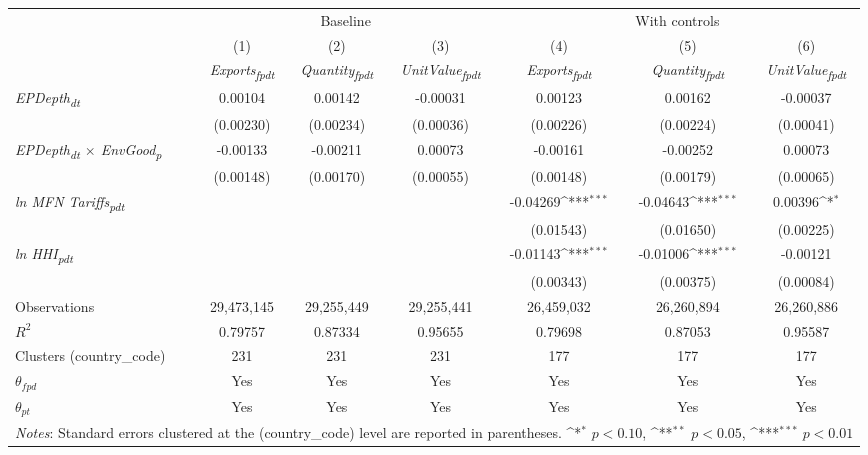 {
\def\sym#1{\ifmmode^{#1}\else\(^{#1}\)\fi}
\begin{tabular}{l*{6}{c}}
\toprule
&\multicolumn{3}{c}{Baseline}&\multicolumn{3}{c}{With controls}\\\cmidrule(lr){2-4}\cmidrule(lr){5-7}
&(1)&(2)&(3)&(4)&(5)&(6)\\
&\textit{Exports\textsubscript{fpdt}}&\textit{Quantity\textsubscript{fpdt}}&\textit{UnitValue\textsubscript{fpdt}}&\textit{Exports\textsubscript{fpdt}}&\textit{Quantity\textsubscript{fpdt}}&\textit{UnitValue\textsubscript{fpdt}}\\
\midrule
\textit{EPDepth\textsubscript{dt}} & 0.00104 & 0.00142 & -0.00031 & 0.00123 & 0.00162 & -0.00037\\
 & (0.00230) & (0.00234) & (0.00036) & (0.00226) & (0.00224) & (0.00041)\\
\addlinespace
\textit{EPDepth\textsubscript{dt} $\times$ EnvGood\textsubscript{p}} & -0.00133 & -0.00211 & 0.00073 & -0.00161 & -0.00252 & 0.00073\\
 & (0.00148) & (0.00170) & (0.00055) & (0.00148) & (0.00179) & (0.00065)\\
\addlinespace
\textit{ln MFN Tariffs\textsubscript{pdt}} &  &  &  & -0.04269\sym{***} & -0.04643\sym{***} & 0.00396\sym{*}\\
 &  &  &  & (0.01543) & (0.01650) & (0.00225)\\
\addlinespace
\textit{ln HHI\textsubscript{pdt}} &  &  &  & -0.01143\sym{***} & -0.01006\sym{***} & -0.00121\\
 &  &  &  & (0.00343) & (0.00375) & (0.00084)\\
\midrule
Observations & 29,473,145 & 29,255,449 & 29,255,441 & 26,459,032 & 26,260,894 & 26,260,886\\
$R^{2}$ & 0.79757 & 0.87334 & 0.95655 & 0.79698 & 0.87053 & 0.95587\\
Clusters (country_code) & 231 & 231 & 231 & 177 & 177 & 177\\
$\theta_{fpd}$ & Yes & Yes & Yes & Yes & Yes & Yes\\
$\theta_{pt}$ & Yes & Yes & Yes & Yes & Yes & Yes\\
\bottomrule
\multicolumn{7}{l}{\footnotesize \textit{Notes}: Standard errors clustered at the (country_code) level are reported in parentheses. \sym{*} \(p<0.10\), \sym{**} \(p<0.05\), \sym{***} \(p<0.01\)}\\
\end{tabular}
}
